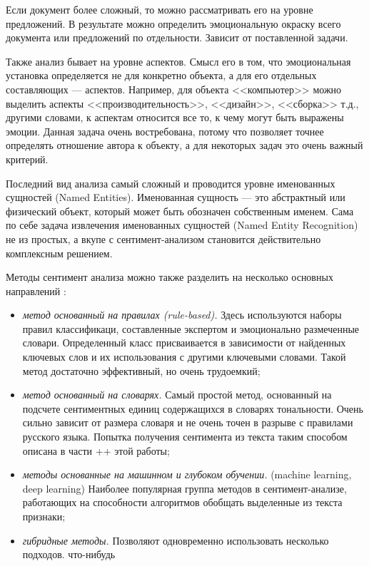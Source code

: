 \bigskip\par
Если документ более сложный, то можно рассматривать его на уровне предложений. В результате можно определить
эмоциональную окраску всего документа или предложений по отдельности. Зависит от поставленной задачи.

\bigskip\par
Также анализ бывает на уровне аспектов. Смысл его в том, что эмоциональная установка определяется не для
конкретно объекта, а для его отдельных составляющих --- аспектов. Например, для объекта <<компьютер>> можно
выделить аспекты <<производительность>>, <<дизайн>>, <<сборка>> т.д., другими словами, к аспектам относится
все то, к чему могут быть выражены эмоции. Данная задача очень востребована, потому что позволяет точнее
определять отношение автора к объекту, а для некоторых задач это очень важный критерий.

\bigskip\par
Последний вид анализа самый сложный и проводится уровне именованных сущностей (Named Entities). Именованная
сущность --- это абстрактный или физический объект, который может быть обозначен собственным именем. Сама по
себе задача извлечения именованных сущностей (Named Entity Recognition) не из простых, а вкупе с
сентимент-анализом становится действительно комплексным решением.


\bigskip\par
Методы сентимент анализа можно также разделить на несколько основных направлений \cite{Semina}:
\bigskip
\begin{itemize}
 \item \textit{метод основанный на правилах (rule-based).} Здесь используются наборы правил классификаци,
составленные экспертом и эмоционально размеченные словари. Определенный класс присваивается в зависимости от
найденных ключевых слов и их использования с другими ключевыми словами. Такой метод достаточно эффективный, но
очень трудоемкий; %

 \item \textit{метод основанный на словарях.} Самый простой метод, основанный  на подсчете сентиментных единиц
содержащихся в словарях тональности. Очень сильно зависит от размера словаря и не очень точен в разрыве с
правилами русского языка. Попытка получения сентимента из текста таким способом описана в части ++ этой
работы;

 \item \textit{методы основанные на машинном и глубоком обучении.} (machine learning, deep learning) Наиболее
популярная группа методов в сентимент-анализе, работающих на способности алгоритмов обобщать выделенные из
текста признаки;

 \item \textit{гибридные методы.} Позволяют одновременно использовать несколько подходов. %
что-нибудь
\end{itemize}


